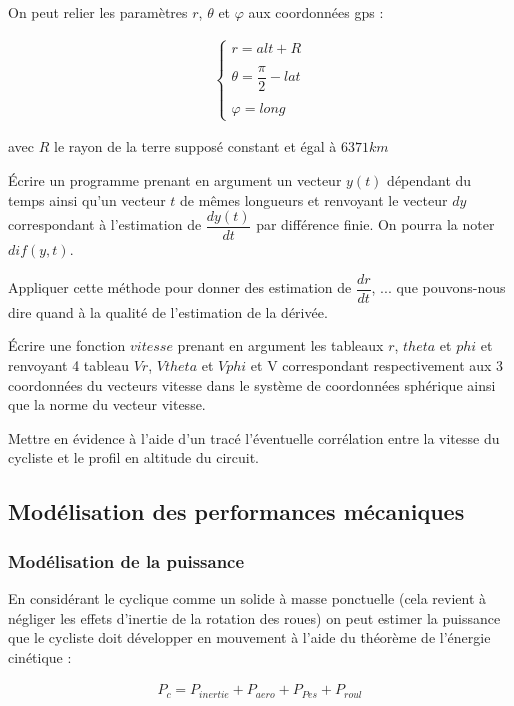 On peut relier les paramètres $r$, $\theta$ et $\varphi$ aux coordonnées gps : 

\begin{align*}
\left\{
\begin{array}{c}
r=alt+R\\
\\
\theta=\dfrac{\pi}{2}-lat\\
\\
\varphi=long
\end{array}
\right.
\end{align*}

avec $R$ le rayon de la terre supposé constant et égal à $6 371km$

\question{} Écrire un programme prenant en argument un vecteur $y(t)$ dépendant du temps ainsi qu'un vecteur $t$ de mêmes longueurs et renvoyant le vecteur $dy$ correspondant à l'estimation de $\dfrac{dy(t)}{dt}$ par différence finie. On pourra la noter $dif(y,t)$.

\question{} Appliquer cette méthode pour donner des estimation de $\dfrac{dr}{dt}$, ... que pouvons-nous dire quand à la qualité de l'estimation de la dérivée.

\question{} Écrire une fonction $vitesse$ prenant en argument les tableaux $r$, $theta$ et $phi$ et renvoyant 4 tableau $Vr$, $Vtheta$ et $Vphi$ et V correspondant respectivement aux 3 coordonnées du vecteurs vitesse dans le système de coordonnées sphérique ainsi que la norme du vecteur vitesse.

\question{} Mettre en évidence à l'aide d'un tracé l'éventuelle corrélation entre la vitesse du cycliste et le profil en altitude du circuit.



\subsection{Modélisation des performances mécaniques}
\subsubsection{Modélisation de la puissance}

En considérant le cyclique comme un solide à masse ponctuelle (cela revient à négliger les effets d'inertie de la rotation des roues) on peut estimer la puissance que le cycliste doit développer en mouvement à l'aide du théorème de l'énergie cinétique : 

\begin{align*}
P_c=P_{inertie}+P_{aero}+P_{Pes}+P_{roul}
\end{align*}

